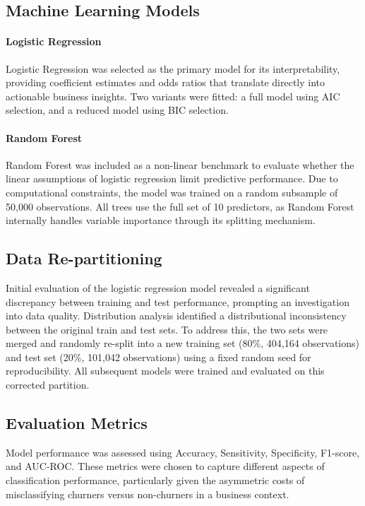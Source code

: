 \documentclass[12pt]{article}
\begin{document}
\subsection{Machine Learning Models}
\paragraph{Logistic Regression}
Logistic Regression was selected as the primary model for its interpretability,
providing coefficient estimates and odds ratios that translate directly into
actionable business insights. Two variants were fitted: a full model using
AIC selection, and a reduced model using BIC selection.

\paragraph{Random Forest}
Random Forest was included as a non-linear benchmark to evaluate whether the
linear assumptions of logistic regression limit predictive performance. Due to
computational constraints, the model was trained on a random subsample of
50,000 observations. All trees use the full set of 10 predictors, as Random
Forest internally handles variable importance through its splitting mechanism.

\subsection{Data Re-partitioning}
Initial evaluation of the logistic regression model revealed a significant 
discrepancy between training and test performance, prompting an investigation 
into data quality. Distribution analysis identified a distributional inconsistency 
between the original train and test sets. To address this, the two sets were 
merged and randomly re-split into a new training set (80\%, 404,164 observations) 
and test set (20\%, 101,042 observations) using a fixed random seed for 
reproducibility. All subsequent models were trained and evaluated on this 
corrected partition.

\subsection{Evaluation Metrics}
Model performance was assessed using Accuracy, Sensitivity, Specificity, 
F1-score, and AUC-ROC. These metrics were chosen to capture different aspects 
of classification performance, particularly given the asymmetric costs of 
misclassifying churners versus non-churners in a business context.
\end{document}
